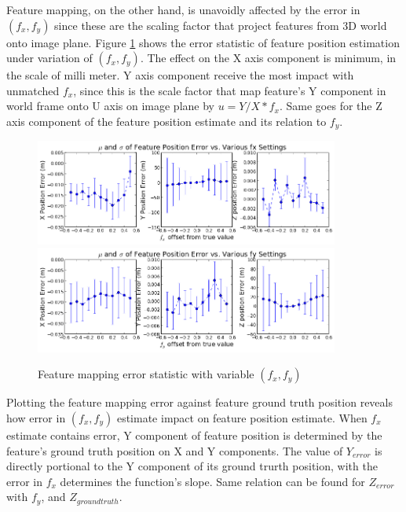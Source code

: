 Feature mapping, on the other hand, is unavoidly affected by the error
in $(f_x, f_y)$ since these are the scaling factor that project
features from 3D world onto image plane. Figure \ref{fig:simfig38-39}
shows the error statistic of feature position estimation under
variation of $(f_x, f_y)$. The effect on the X axis component is
minimum, in the scale of milli meter. Y axis component receive the
most impact with unmatched $f_x$, since this is the scale factor that
map feature's Y component in world frame onto U axis on image plane by
$u = Y/X*f_x$. Same goes for the Z axis component of the feature
position estimate and its relation to $f_y$.
\begin{figure}[h]
  \centering
  \includegraphics[width=10cm,keepaspectratio=true]{./Figures/SimulationFigures/Figure38.png}
  \includegraphics[width=10cm,keepaspectratio=true]{./Figures/SimulationFigures/Figure39.png}
  \caption{Feature mapping error statistic with variable $(f_x, f_y)$}
  \label{fig:simfig38-39}
\end{figure}

Plotting the feature mapping error against feature ground truth
position reveals how error in $(f_x, f_y)$ estimate impact on feature
position estimate. When $f_x$ estimate contains error, Y component of
feature position is determined by the feature's ground truth position
on X and Y components. The value of $Y_{error}$ is directly portional
to the Y component of its ground trurth position, with the error in
$f_x$ determines the function's slope. Same relation can be found for
$Z_{error}$ with $f_y$, and $Z_{ground truth}$.

